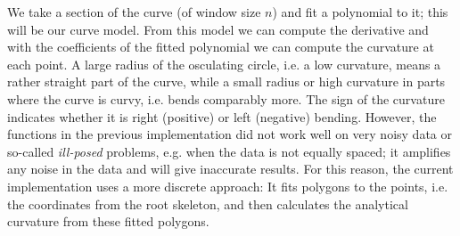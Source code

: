 We  take a section of the curve (of window size \(n\)) and fit a polynomial to it; this will be our curve model. From this model we can compute the derivative and with the coefficients of the fitted polynomial we can compute the curvature at each point. 
A large radius of the osculating circle, i.e. a low curvature, means a rather straight part of the curve, while a small radius or high curvature in parts where the curve is curvy, i.e. bends comparably more. The sign of the curvature indicates whether it is right (positive) or left (negative) bending. However, the 
functions in the previous implementation did not work well on very noisy data or so-called \textit{ill-posed} problems, e.g. when the data is not equally spaced; %
it amplifies any noise in the data and will give inaccurate results.
For this reason, the current implementation uses a more discrete approach: It fits polygons to the points, i.e. the coordinates from the root skeleton, and then calculates the analytical curvature from these fitted polygons. 



%




